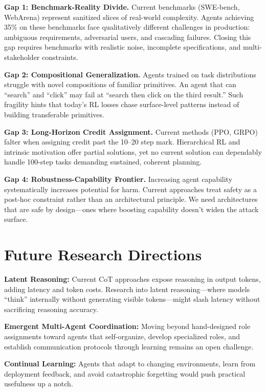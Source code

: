 \documentclass[12pt,a4paper]{report}
\theoremstyle{definition}
\begin{document}
\textbf{Gap 1: Benchmark-Reality Divide.} Current benchmarks (SWE-bench, WebArena) represent sanitized slices of real-world complexity. Agents achieving 35\% on these benchmarks face qualitatively different challenges in production: ambiguous requirements, adversarial users, and cascading failures. Closing this gap requires benchmarks with realistic noise, incomplete specifications, and multi-stakeholder constraints.

\textbf{Gap 2: Compositional Generalization.} Agents trained on task distributions struggle with novel compositions of familiar primitives. An agent that can ``search'' and ``click'' may fail at ``search then click on the third result.'' Such fragility hints that today's RL losses chase surface-level patterns instead of building transferable primitives.

\textbf{Gap 3: Long-Horizon Credit Assignment.} Current methods (PPO, GRPO) falter when assigning credit past the 10--20 step mark. Hierarchical RL and intrinsic motivation offer partial solutions, yet no current solution can dependably handle 100-step tasks demanding sustained, coherent planning.

\textbf{Gap 4: Robustness-Capability Frontier.} Increasing agent capability systematically increases potential for harm. Current approaches treat safety as a post-hoc constraint rather than an architectural principle. We need architectures that are safe by design---ones where boosting capability doesn't widen the attack surface.

\section{Future Research Directions}

\textbf{Latent Reasoning:} Current CoT approaches expose reasoning in output tokens, adding latency and token costs. Research into latent reasoning---where models ``think'' internally without generating visible tokens---might slash latency without sacrificing reasoning accuracy.

\textbf{Emergent Multi-Agent Coordination:} Moving beyond hand-designed role assignments toward agents that self-organize, develop specialized roles, and establish communication protocols through learning remains an open challenge.

\textbf{Continual Learning:} Agents that adapt to changing environments, learn from deployment feedback, and avoid catastrophic forgetting would push practical usefulness up a notch.
\end{document}
